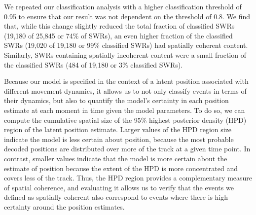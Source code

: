 \documentclass[9pt,lineno]{elife}
\begin{document}
We repeated our classification analysis with a higher classification threshold of 0.95 to ensure that our result was not dependent on the threshold of 0.8. We find that, while this change slightly reduced the total fraction of classified SWRs (19,180 of 25,845 or 74\% of SWRs), an even higher fraction of the classified SWRs (19,020 of 19,180 or 99\% classified SWRs) had spatially coherent content. Similarly, SWRs containing spatially incoherent content were a small fraction of the classified SWRs (484 of 19,180 or 3\% classified SWRs).

Because our model is specified in the context of a latent position associated with different movement dynamics, it allows us to not only classify events in terms of their dynamics, but also to quantify the model's certainty in each position estimate at each moment in time given the model parameters. To do so, we can compute the cumulative spatial size of the 95\% highest posterior density (HPD) region of the latent position estimate. Larger values of the HPD region size indicate the model is less certain about position, because the most probable decoded positions are distributed over more of the track at a given time point. In contrast, smaller values indicate that the model is more certain about the estimate of position because the extent of the HPD is more concentrated and covers less of the track. Thus, the HPD region provides a complementary measure of spatial coherence, and evaluating it allows us to verify that the events we defined as spatially coherent also correspond to events where there is high certainty around the position estimates. 
\end{document}
